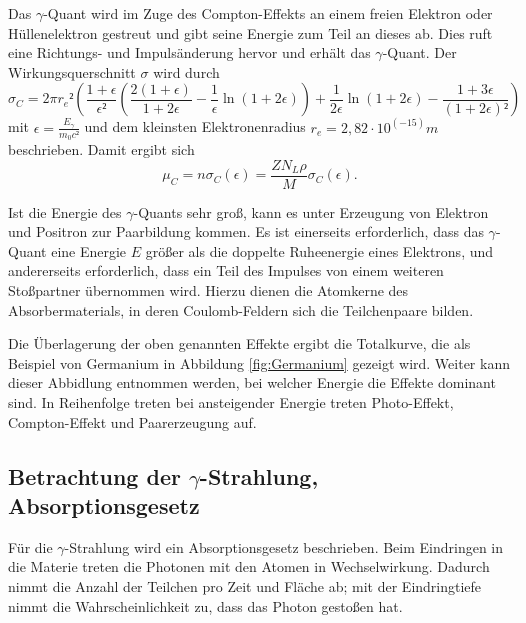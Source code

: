 Das $\gamma$-Quant wird im Zuge des Compton-Effekts an einem freien Elektron oder Hüllenelektron gestreut und gibt seine Energie zum Teil an dieses ab. 
Dies ruft eine Richtungs- und Impulsänderung hervor und erhält das $\gamma$-Quant.
Der Wirkungsquerschnitt $\sigma$ wird durch
\begin{equation}
	\sigma_C=2\pi  r_e²\left(\frac{1+\epsilon}{\epsilon²}\left(\frac{2(1+\epsilon)}{1+2\epsilon}-\frac{1}{\epsilon}\ln(1+2\epsilon)\right)+\frac{1}{2\epsilon}\ln(1+2\epsilon)-\frac{1+3\epsilon}{(1+2\epsilon)²}\right)
\end{equation}
mit $\epsilon=\frac{E_{\gamma}}{m_0c²}$ und dem kleinsten Elektronenradius $r_e=2,82\cdot 10^(-15)m$ beschrieben. 
Damit ergibt sich
\begin{equation}
\mu_C=n\sigma_C(\epsilon)=\frac{Z N_L \rho}{M}\sigma_C(\epsilon).
\end{equation}

Ist die Energie des $\gamma$-Quants sehr groß, kann es unter Erzeugung von Elektron und Positron zur Paarbildung kommen.
Es ist einerseits erforderlich, dass das $\gamma$-Quant eine Energie $E$ größer als die doppelte Ruheenergie eines Elektrons, und andererseits erforderlich, dass ein Teil des Impulses von einem weiteren Stoßpartner übernommen wird.
Hierzu dienen die Atomkerne des Absorbermaterials, in  deren Coulomb-Feldern  sich die  Teilchenpaare bilden.

Die Überlagerung der oben genannten Effekte ergibt die Totalkurve, die als Beispiel von Germanium in Abbildung \ref{fig:Germanium} gezeigt wird.
Weiter kann dieser Abbidlung entnommen werden, bei welcher Energie die Effekte dominant sind.
In Reihenfolge treten bei ansteigender Energie treten Photo-Effekt, Compton-Effekt und Paarerzeugung auf.


\subsection{Betrachtung der \texorpdfstring{$\gamma$}{Gamma}-Strahlung, Absorptionsgesetz}
\label{sec:gamma}
Für die $\gamma$-Strahlung wird ein Absorptionsgesetz beschrieben.
Beim Eindringen in die Materie treten die Photonen mit den Atomen in Wechselwirkung. 
Dadurch nimmt die Anzahl der Teilchen pro Zeit und Fläche ab; mit der Eindringtiefe nimmt die Wahrscheinlichkeit zu, 
dass das Photon gestoßen hat.

